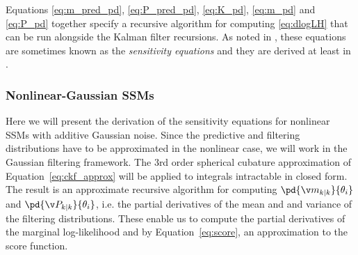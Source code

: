 Equations \eqref{eq:m_pred_pd}, \eqref{eq:P_pred_pd}, \eqref{eq:K_pd}, \eqref{eq:m_pd} and \eqref{eq:P_pd} together specify
a recursive algorithm for computing \eqref{eq:dlogLH} that can be run alongside the Kalman filter recursions.
As noted in \textcite{Cappe2005}, these equations are sometimes known as the \emph{sensitivity equations}
and they are derived at least in \textcite{Gupta1974}.


\subsubsection{Nonlinear-Gaussian SSMs}\label{sec:grad_nonlinear}%


Here we will present the derivation of the sensitivity equations for nonlinear SSMs with additive
Gaussian noise. Since the predictive and filtering distributions have to be approximated in the nonlinear
case, we will work in the Gaussian filtering framework. The 3rd order spherical cubature approximation
of Equation~\eqref{eq:ckf_approx} will be applied to integrals intractable in closed form. The result
is an approximate recursive algorithm for computing $\pd{\m_{k|k}}{\theta_i}$ and $\pd{\P_{k|k}}{\theta_i}$,
i.e. the partial derivatives of the mean and and variance of the filtering distributions. These enable
us to compute the partial derivatives of the marginal log-likelihood and by Equation~\eqref{eq:score},
an approximation to the score function.

